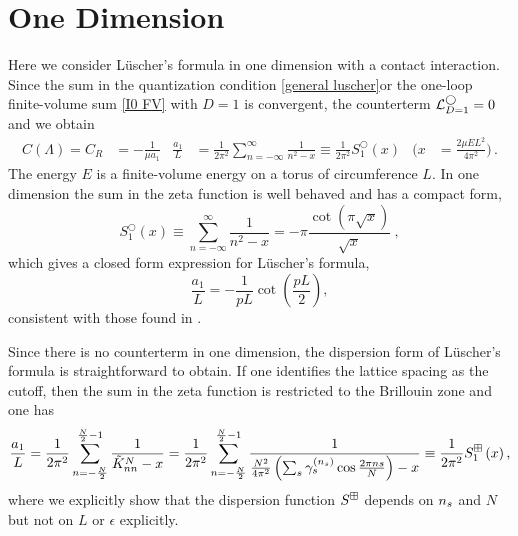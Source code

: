 \section{One Dimension}\label{sec:1D}

Here we consider L\"uscher's formula in one dimension with a contact interaction.
Since the sum in the quantization condition \eqref{general luscher}or the one-loop finite-volume sum \eqref{I0 FV} with $D=1$ is convergent, the counterterm $\mathcal{L}_{D=1}^\bigcirc=0$ and we obtain
\begin{align}
    C(\Lambda)
    = 
    C_R
        &=
            -\frac{1}{\mu a_{1}}
    &
    \frac{a_{1}}{L}
        &=
            \frac{1}{2 \pi^{2}}
            \sum_{n=-\infty}^{\infty} \frac{1}{n^{2}-x}
        \equiv
            \frac{1}{2 \pi^{2}}
            S^\bigcirc_{1}\left(x\right)
    &
    \Bigg(x
        &=
            \frac{2\mu E L^2}{4\pi^2}\Bigg)
    \, .
\end{align}
The energy $E$ is a finite-volume energy on a torus of circumference $L$.
In one dimension the sum in the zeta function is well behaved and has a compact form,
\begin{equation}\label{eq:1d luscher}
S^\bigcirc_{1}(x) \equiv \sum_{n=-\infty}^{\infty} \frac{1}{n^{2}-x}=-\pi \frac{\cot (\pi \sqrt{x})}{\sqrt{x}}\ ,
\end{equation}
which gives a closed form expression for L\"uscher's formula,
\begin{equation}\label{eq:1d luscher constant}
\frac{a_{1}}{L} =-\frac{1}{pL}\cot\left(\frac{pL}{2}\right),
\end{equation}
consistent with those found in \cite{}.

Since there is no counterterm in one dimension, the dispersion form of L\"uscher's formula is straightforward to obtain.  If one identifies the lattice spacing as the cutoff, then the sum in the zeta function is restricted to the Brillouin zone and one has
\begin{equation}
    \frac{a_{1}}{L}
    =
    \frac{1}{2 \pi^{2}} \sum_{n=-\frac{N}{2}}^{\frac{N}{2}-1} \frac{1}{\tilde{K}^N_{nn}-x}
    =
    \frac{1}{2 \pi^{2}} \sum_{n=-\frac{N}{2}}^{\frac{N}{2}-1} \frac{1}{\frac{N^2}{4\pi^2}\left(\sum_{s}\gamma_s^{({n_s})}\cos\frac{2\pi n s}{N}\right)-x}
    \equiv
    \frac{1}{2 \pi^{2}} S^{\boxplus}_{1}\left(x\right),\label{eq:1d dispersion luscher}
\end{equation}
where we explicitly show that the dispersion function $S^{\boxplus}$ depends on ${n_s}$ and $N$ but not on $L$ or $\epsilon$ explicitly.

